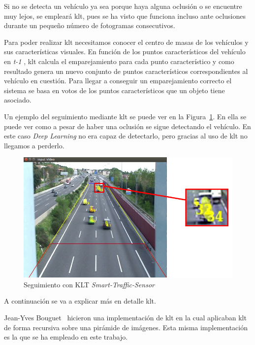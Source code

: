 Si no se detecta un vehículo ya sea porque haya alguna oclusión o se encuentre muy lejos, se empleará \acrshort{klt}, pues se ha visto que funciona incluso ante oclusiones durante un pequeño número de fotogramas consecutivos.

Para poder realizar \acrshort{klt} necesitamos conocer el centro de masas de los vehículos y sus características visuales. En función de los puntos característicos del vehículo en \textit{t-1} , \acrshort{klt} calcula el emparejamiento para cada punto característico y como resultado genera un nuevo conjunto de puntos característicos correspondientes al vehículo en cuestión. Para llegar a conseguir un emparejamiento correcto el sistema se basa en votos de los puntos característicos que un objeto tiene asociado. 

Un ejemplo del seguimiento mediante \acrshort{klt} se puede ver en la Figura~\ref{fig.klt_deteccion}. En ella se puede ver como a pesar de haber una oclusión se sigue detectando el vehículo. En este caso \textit{Deep Learning} no era capaz de detectarlo, pero gracias al uso de \acrshort{klt} no llegamos a perderlo.

 \begin{figure}[H] 
\begin{center}
   \includegraphics[scale=0.5]{figures/Diseno_global/klt_deteccion.png}
   \caption{Seguimiento con KLT \textit{Smart-Traffic-Sensor}}
	\label{fig.klt_deteccion}
\end{center}
\end{figure}

A continuación se va a explicar más en detalle \acrshort{klt}.

Jean-Yves Bouguet~\cite{klt_bouguet} hicieron una implementación de \acrshort{klt} en la cual aplicaban \acrshort{klt} de forma recursiva sobre una pirámide de imágenes. Esta misma implementación es la que se ha empleado en este trabajo. 

